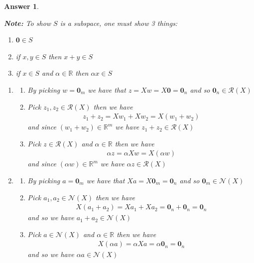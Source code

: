 \documentclass[12pt]{article}
\theoremstyle{colon}
\newtheorem*{answer}{Answer}
\begin{document}
\begin{answer}
  \

  \textbf{Note: } To show $S$ is a subspace, one must show 3 things:
  \begin{enumerate}[label=\roman*)]
    \item $\bm{0} \in S$
    \item if $x, y \in S$ then $x + y \in S$
    \item if $x \in S$ and $\alpha \in \mathbb{R}$ then $\alpha x \in S$
  \end{enumerate}

  \begin{enumerate}[label=\alph*)]
    \item 
      \begin{enumerate}[label=\roman*)]
        \item By picking $w = \bm{0}_m$ we have that $z = X w = X \bm{0} = \bm{0}_n$ and so $\bm{0}_n \in \mathcal{R}(X)$

        \item Pick $z_1, z_2 \in \mathcal{R}(X)$ then we have
          \begin{gather*}
            z_1 + z_2 = X w_1 + X w_2 = X (w_1 + w_2)
          \end{gather*}
          and since $(w_1 + w_2) \in \mathbb{R}^m$ we have $z_1 + z_2 \in \mathcal{R}(X)$

        \item Pick $z\in \mathcal{R}(X)$ and $\alpha \in \mathbb{R}$ then we have
          \begin{gather*}
            \alpha z = \alpha X w = X (\alpha w)
          \end{gather*}
          and since $(\alpha w) \in \mathbb{R}^m$ we have $\alpha z \in \mathcal{R}(X)$
      \end{enumerate}

    \item 
      \begin{enumerate}[label=\roman*)]
        \item By picking $a = \bm{0}_m$ we have that $X a = X \bm{0}_m = \bm{0}_n$ and so $\bm{0}_m \in \mathcal{N}(X)$

        \item Pick $a_1, a_2 \in \mathcal{N}(X)$ then we have
          \begin{gather*}
            X(a_1 + a_2) = X a_1 + X a_2 = \bm{0}_n + \bm{0}_n = \bm{0}_n
          \end{gather*}
          and so we have $a_1 + a_2 \in \mathcal{N}(X)$

        \item Pick $a\in \mathcal{N}(X)$ and $\alpha \in \mathbb{R}$ then we have
          \begin{gather*}
            X (\alpha a) = \alpha X a = \alpha \bm{0}_n = \bm{0}_n
          \end{gather*}
          and so we have $\alpha a \in \mathcal{N}(X)$
      \end{enumerate}
  \end{enumerate}
\end{answer}
\end{document}
